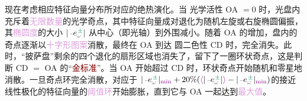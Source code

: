 现在考虑相应\textcolor{PineGreen}{特征向量}分布所对应的\textcolor{NavyBlue}{绝热演化}。当 \textcolor{NavyBlue}{光学活性 OA} $= 0$ 时，光盘内充斥着\textcolor{Plum}{无限数量}的\textcolor{PineGreen}{光学奇点}，其中\textcolor{PineGreen}{特征向量}成对退化为随机\textcolor{NavyBlue}{左旋}或\textcolor{NavyBlue}{右旋}\textcolor{PineGreen}{椭圆偏振}，其\textcolor{Plum}{椭圆度}的大小 $|\xint{\begin{smallmatrix} ~ \\ {}^{}_{\mathcolor{gray}{-}} \\ ~ \end{smallmatrix}}{08}{e}^{\;\!\textcolor{PineGreen}{\pm}}_{\mathcolor{gray}{\omega}}|$ 从中心（即\textcolor{PineGreen}{光轴}）到外围减小。随着 \textcolor{NavyBlue}{OA} 的增加，\textcolor{PineGreen}{盘}内的\textcolor{PineGreen}{奇点}逐渐以\textcolor{Plum}{十字形图案}消散，最终在 \textcolor{NavyBlue}{OA} 到达 \textcolor{NavyBlue}{圆二色性 CD} 时，完全消失。此时，“\textcolor{PineGreen}{披萨盘}”剩余的四个\textcolor{PineGreen}{退化的}扇形区域也消失了，留下了一圈\textcolor{PineGreen}{环状奇点}，这是判断 \textcolor{NavyBlue}{CD} $=$ \textcolor{NavyBlue}{OA} 的“\textcolor{Maroon}{金标准}”。当 \textcolor{NavyBlue}{OA} 开始超过 \textcolor{NavyBlue}{CD} 时，\textcolor{PineGreen}{环状奇点}开始随机和零星地消散。一旦\textcolor{PineGreen}{奇点环}完全消散，对应于 $|\xint{\begin{smallmatrix} ~ \\ {}^{}_{\mathcolor{gray}{-}} \\ ~ \end{smallmatrix}}{08}{e}^{\;\!\textcolor{PineGreen}{\pm}}_{\mathcolor{gray}{\omega}}|_{\textcolor{Plum}{\min}} + 20\% (\textcolor{Plum}{\langle\textcolor{black}{|\xint{\begin{smallmatrix} ~ \\ {}^{}_{\mathcolor{gray}{-}} \\ ~ \end{smallmatrix}}{08}{e}^{\;\!\textcolor{PineGreen}{\pm}}_{\mathcolor{gray}{\omega}}|}\rangle} - |\xint{\begin{smallmatrix} ~ \\ {}^{}_{\mathcolor{gray}{-}} \\ ~ \end{smallmatrix}}{08}{e}^{\;\!\textcolor{PineGreen}{\pm}}_{\mathcolor{gray}{\omega}}|_{\textcolor{Plum}{\min}})$的接近\textcolor{PineGreen}{线性极化}的\textcolor{PineGreen}{特征向量}的\textcolor{Plum}{阈值环}开始膨胀，直到它与 \textcolor{NavyBlue}{OA} 一起达到\textcolor{Plum}{最大值}。

